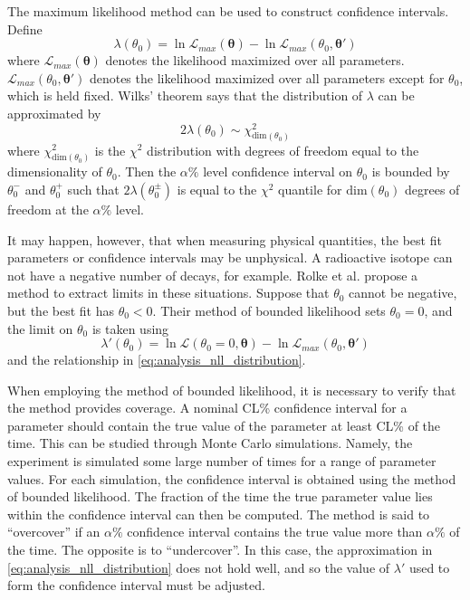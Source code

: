 \documentclass[herrin-thesis.tex]{subfiles}
\begin{document}
The maximum likelihood method can be used to construct confidence intervals. Define
\begin{equation}
\lambda({\theta_0}) = \ln \mathcal{L}_{max}(\boldsymbol{\theta}) - \ln \mathcal{L}_{max}(\theta_0, \boldsymbol{\theta}')
\end{equation}
where \(\mathcal{L}_{max}(\boldsymbol{\theta})\) denotes the likelihood maximized over all parameters. \(\mathcal{L}_{max}(\theta_0, \boldsymbol{\theta}')\) denotes the likelihood maximized over all parameters except for \(\theta_0\), which is held fixed. Wilks' theorem \cite{Wilks:1938uq} says that the distribution of \(\lambda\) can be approximated by
\begin{equation}
2\lambda(\theta_0) \sim \chi^2_{\text{dim}(\theta_0)}
\label{eq:analysis_nll_distribution}
\end{equation}
where \(\chi^2_{\text{dim}(\theta_0)}\) is the \(\chi^2\) distribution with degrees of freedom equal to the dimensionality of \(\theta_0\). Then the \(\alpha\%\) level confidence interval on \(\theta_0\) is bounded by \(\theta_0^-\) and \(\theta_0^+\) such that \(2\lambda(\theta_0^\pm)\) is equal to the \(\chi^2\) quantile for \(\text{dim}(\theta_0)\) degrees of freedom at the \(\alpha\%\) level.

It may happen, however, that when measuring physical quantities, the best fit parameters or confidence intervals may be unphysical. A radioactive isotope can not have a negative number of decays, for example. Rolke et al. \cite{Rolke:2005uq} propose a method to extract limits in these situations. Suppose that \(\theta_0\) cannot be negative, but the best fit has \(\theta_0 < 0\). Their method of bounded likelihood sets \(\theta_0 = 0\), and the limit on \(\theta_0\) is taken using
\begin{equation}
\lambda'({\theta_0}) = \ln \mathcal{L}(\theta_0 = 0, \boldsymbol{\theta}) - \ln \mathcal{L}_{max}(\theta_0, \boldsymbol{\theta}')
\end{equation}
and the relationship in \cref{eq:analysis_nll_distribution}.

When employing the method of bounded likelihood, it is necessary to verify that the method provides coverage. A nominal CL\% confidence interval for a parameter should contain the true value of the parameter at least CL\% of the time. This can be studied through Monte Carlo simulations. Namely, the experiment is simulated some large number of times for a range of parameter values. For each simulation, the confidence interval is obtained using the method of bounded likelihood. The fraction of the time the true parameter value lies within the confidence interval can then be computed. The method is said to ``overcover'' if an \(\alpha\%\) confidence interval contains the true value more than \(\alpha\%\) of the time. The opposite is to ``undercover''. In this case, the approximation in \cref{eq:analysis_nll_distribution} does not hold well, and so the value of \(\lambda'\) used to form the confidence interval must be adjusted.
\end{document}
